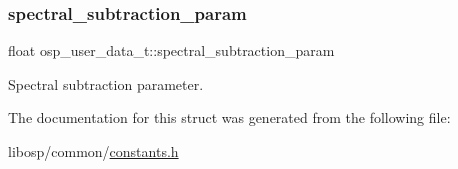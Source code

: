 \subsubsection{\texorpdfstring{spectral\+\_\+subtraction\+\_\+param}{spectral\_subtraction\_param}}
{\footnotesize\ttfamily float osp\+\_\+user\+\_\+data\+\_\+t\+::spectral\+\_\+subtraction\+\_\+param}



Spectral subtraction parameter. 



The documentation for this struct was generated from the following file\+:\begin{DoxyCompactItemize}
\item 
libosp/common/\mbox{\hyperlink{constants_8h}{constants.\+h}}\end{DoxyCompactItemize}
